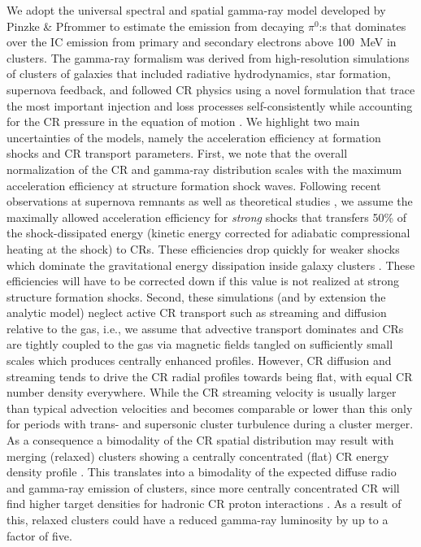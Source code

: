 \documentclass[10pt,aps,pra,reprint,amsmath,amsfonts,amssymb,showpacs,nofootinbib,floatfix]{revtex4-1}
\begin{document}
We adopt the universal spectral and spatial gamma-ray model developed by Pinzke
\& Pfrommer \cite{2010MNRAS.409..449P} to estimate the emission from decaying
$\pi^0$:s that dominates over the IC emission from primary and secondary
electrons above 100~MeV in clusters. The gamma-ray formalism was derived from
high-resolution simulations of clusters of galaxies that included radiative
hydrodynamics, star formation, supernova feedback, and followed CR physics using
a novel formulation that trace the most important injection and loss processes
self-consistently while accounting for the CR pressure in the equation of motion
\cite{2008A&A...481...33J,2007A&A...473...41E,2006MNRAS.367..113P}.  We
highlight two main uncertainties of the models, namely the acceleration
efficiency at formation shocks and CR transport parameters. First, we note that
the overall normalization of the CR and gamma-ray distribution scales with the
maximum acceleration efficiency at structure formation shock waves. Following
recent observations at supernova remnants \cite{2009Sci...325..719H} as well as
theoretical studies \cite{2005ApJ...620...44K}, we assume the maximally allowed
acceleration efficiency for {\em strong} shocks that transfers 50\% of the
shock-dissipated energy (kinetic energy corrected for adiabatic compressional
heating at the shock) to CRs. These efficiencies drop quickly for weaker shocks
\cite{2007A&A...473...41E} which dominate the gravitational energy dissipation
inside galaxy clusters \cite{2006MNRAS.367..113P}. These efficiencies will have
to be corrected down if this value is not realized at strong structure formation
shocks. Second, these simulations (and by extension the analytic model) neglect
active CR transport such as streaming and diffusion relative to the gas, i.e.,
we assume that advective transport dominates and CRs are tightly coupled to the
gas via magnetic fields tangled on sufficiently small scales which produces
centrally enhanced profiles. However, CR diffusion and streaming tends to drive
the CR radial profiles towards being flat, with equal CR number density
everywhere. While the CR streaming velocity is usually larger than typical
advection velocities and becomes comparable or lower than this only for periods
with trans- and supersonic cluster turbulence during a cluster merger. As a
consequence a bimodality of the CR spatial distribution may result with merging
(relaxed) clusters showing a centrally concentrated (flat) CR energy density
profile \cite{2011A&A...527A..99E}. This translates into a bimodality of the
expected diffuse radio and gamma-ray emission of clusters, since more centrally
concentrated CR will find higher target densities for hadronic CR proton
interactions \cite{2011A&A...527A..99E}. As a result of this, relaxed clusters
could have a reduced gamma-ray luminosity by up to a factor of five.
\end{document}
